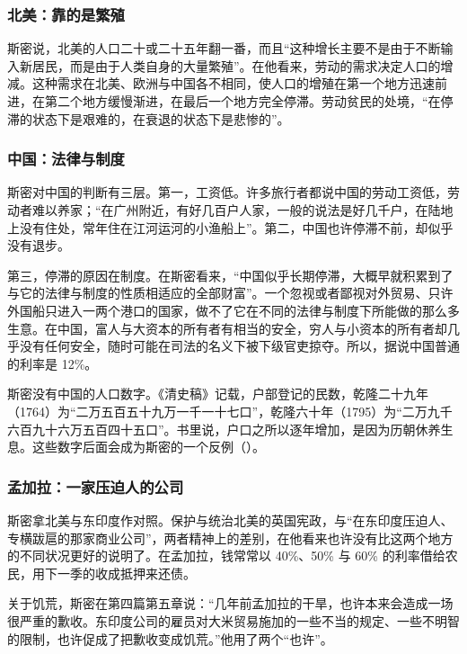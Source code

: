 \subsubsection{北美：靠的是繁殖}
斯密说，北美的人口二十或二十五年翻一番，而且“这种增长主要不是由于不断输入新居民，而是由于人类自身的大量繁殖”\cite{smith1776}。在他看来，劳动的需求决定人口的增减。这种需求在北美、欧洲与中国各不相同，使人口的增殖在第一个地方迅速前进，在第二个地方缓慢渐进，在最后一个地方完全停滞。劳动贫民的处境，“在停滞的状态下是艰难的，在衰退的状态下是悲惨的”\cite{smith1776}。

\subsubsection{中国：法律与制度}
斯密对中国的判断有三层。第一，工资低。许多旅行者都说中国的劳动工资低，劳动者难以养家；“在广州附近，有好几百户人家，一般的说法是好几千户，在陆地上没有住处，常年住在江河运河的小渔船上”\cite{smith1776}。第二，中国也许停滞不前，却似乎没有退步\cite{smith1776}。

第三，停滞的原因在制度。在斯密看来，“中国似乎长期停滞，大概早就积累到了与它的法律与制度的性质相适应的全部财富”。一个忽视或者鄙视对外贸易、只许外国船只进入一两个港口的国家，做不了它在不同的法律与制度下所能做的那么多生意。在中国，富人与大资本的所有者有相当的安全，穷人与小资本的所有者却几乎没有任何安全，随时可能在司法的名义下被下级官吏掠夺。所以，据说中国普通的利率是 12\%\cite{smith1776}。

斯密没有中国的人口数字。《清史稿》记载，户部登记的民数，乾隆二十九年（1764）为“二万五百五十九万一千一十七口”，乾隆六十年（1795）为“二万九千六百九十六万五百四十五口”。书里说，户口之所以逐年增加，是因为历朝休养生息\cite{qingshigao}。这些数字后面会成为斯密的一个反例（）。

\subsubsection{孟加拉：一家压迫人的公司}
斯密拿北美与东印度作对照。保护与统治北美的英国宪政，与“在东印度压迫人、专横跋扈的那家商业公司”，两者精神上的差别，在他看来也许没有比这两个地方的不同状况更好的说明了\cite{smith1776}。在孟加拉，钱常常以 40\%、50\% 与 60\% 的利率借给农民，用下一季的收成抵押来还债\cite{smith1776}。

关于饥荒，斯密在第四篇第五章说：“几年前孟加拉的干旱，也许本来会造成一场很严重的歉收。东印度公司的雇员对大米贸易施加的一些不当的规定、一些不明智的限制，也许促成了把歉收变成饥荒。”\cite{smith1776}他用了两个“也许”。


